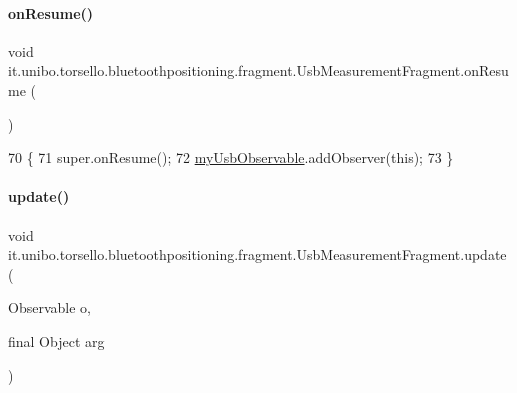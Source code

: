 \paragraph{\texorpdfstring{on\+Resume()}{onResume()}}
{\footnotesize\ttfamily void it.\+unibo.\+torsello.\+bluetoothpositioning.\+fragment.\+Usb\+Measurement\+Fragment.\+on\+Resume (\begin{DoxyParamCaption}{ }\end{DoxyParamCaption})}


\begin{DoxyCode}
70                            \{
71         super.onResume();
72         \hyperlink{classit_1_1unibo_1_1torsello_1_1bluetoothpositioning_1_1fragment_1_1UsbMeasurementFragment_adefc2433786f22fffe560fadefec9e2c_adefc2433786f22fffe560fadefec9e2c}{myUsbObservable}.addObserver(\textcolor{keyword}{this});
73     \}
\end{DoxyCode}
\hypertarget{classit_1_1unibo_1_1torsello_1_1bluetoothpositioning_1_1fragment_1_1UsbMeasurementFragment_abc309a85fe75275173331dbe7a73ab2b_abc309a85fe75275173331dbe7a73ab2b}{}\label{classit_1_1unibo_1_1torsello_1_1bluetoothpositioning_1_1fragment_1_1UsbMeasurementFragment_abc309a85fe75275173331dbe7a73ab2b_abc309a85fe75275173331dbe7a73ab2b} 
\paragraph{\texorpdfstring{update()}{update()}}
{\footnotesize\ttfamily void it.\+unibo.\+torsello.\+bluetoothpositioning.\+fragment.\+Usb\+Measurement\+Fragment.\+update (\begin{DoxyParamCaption}\item[{Observable}]{o,  }\item[{final Object}]{arg }\end{DoxyParamCaption})}


